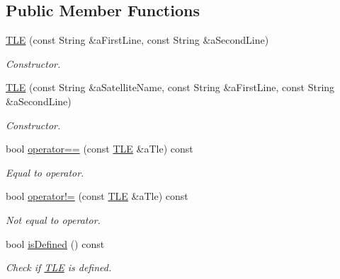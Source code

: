 \subsection*{Public Member Functions}
\begin{DoxyCompactItemize}
\item 
\hyperlink{classostk_1_1astro_1_1trajectory_1_1orbit_1_1models_1_1sgp4_1_1_t_l_e_a57323db2c24577c2e8ddce79fa776d1e}{T\+LE} (const String \&a\+First\+Line, const String \&a\+Second\+Line)
\begin{DoxyCompactList}\small\item\em Constructor. \end{DoxyCompactList}\item 
\hyperlink{classostk_1_1astro_1_1trajectory_1_1orbit_1_1models_1_1sgp4_1_1_t_l_e_af1563fe99c5e1bf2874cf294c0e811bd}{T\+LE} (const String \&a\+Satellite\+Name, const String \&a\+First\+Line, const String \&a\+Second\+Line)
\begin{DoxyCompactList}\small\item\em Constructor. \end{DoxyCompactList}\item 
bool \hyperlink{classostk_1_1astro_1_1trajectory_1_1orbit_1_1models_1_1sgp4_1_1_t_l_e_a415bc7b3671eaa616dfd9e82f9fb9520}{operator==} (const \hyperlink{classostk_1_1astro_1_1trajectory_1_1orbit_1_1models_1_1sgp4_1_1_t_l_e}{T\+LE} \&a\+Tle) const
\begin{DoxyCompactList}\small\item\em Equal to operator. \end{DoxyCompactList}\item 
bool \hyperlink{classostk_1_1astro_1_1trajectory_1_1orbit_1_1models_1_1sgp4_1_1_t_l_e_a3b15abd9b07fb2a0851b680fe23da8f6}{operator!=} (const \hyperlink{classostk_1_1astro_1_1trajectory_1_1orbit_1_1models_1_1sgp4_1_1_t_l_e}{T\+LE} \&a\+Tle) const
\begin{DoxyCompactList}\small\item\em Not equal to operator. \end{DoxyCompactList}\item 
bool \hyperlink{classostk_1_1astro_1_1trajectory_1_1orbit_1_1models_1_1sgp4_1_1_t_l_e_aa7fa1003a2b03fb7f3829bfdd342942f}{is\+Defined} () const
\begin{DoxyCompactList}\small\item\em Check if \hyperlink{classostk_1_1astro_1_1trajectory_1_1orbit_1_1models_1_1sgp4_1_1_t_l_e}{T\+LE} is defined. \end{DoxyCompactList}\item 

\end{DoxyCompactItemize}
